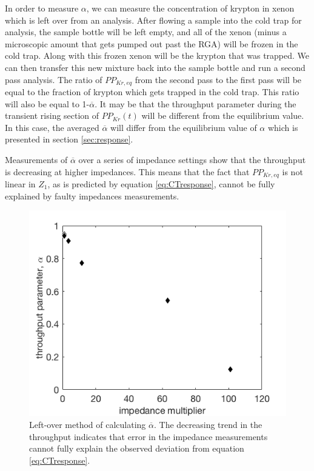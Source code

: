 In order to measure $\alpha$, we can measure the concentration of krypton in xenon which is left over from an analysis. After flowing a sample into the cold trap for analysis, the sample bottle will be left empty, and all of the xenon (minus a microscopic amount that gets pumped out past the RGA) will be frozen in the cold trap. Along with this frozen xenon will be the krypton that was trapped. We can then transfer this new mixture back into the sample bottle and run a second pass analysis. The ratio of $PP_{Kr,eq}$  from the second pass to the first pass will be equal to the fraction of krypton which gets trapped in the cold trap. This ratio will also be equal to 1-$\overline{\alpha}$. It may be that the throughput parameter during the transient rising section of $PP_{Kr}(t)$ will be different from the equilibrium value. In this case, the averaged $\overline{\alpha}$ will differ from the equilibrium value of $\alpha$ which is presented in section \ref{sec:response}. 

Measurements of $\overline{\alpha}$ over a series of impedance settings show that the throughput is decreasing at higher impedances. This means that the fact that $PP_{Kr,eq}$ is not linear in $Z_1$, as is predicted by equation \ref{eq:CTresponse}, cannot be fully explained by faulty impedances measurements.
\begin{figure}[h!]
\centering
\includegraphics[width=\textwidth]{Figures/SLAC_alpha.png}
\caption{Left-over method of calculating $\overline{\alpha}$. The decreasing trend in the throughput indicates that error in the impedance measurements cannot fully explain the observed deviation from equation \ref{eq:CTresponse}. }
\label{fig:alpha}
\end{figure}

